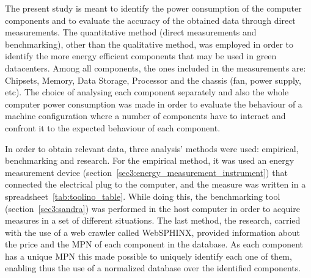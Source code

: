     The present study is meant to identify the power consumption of the computer components and to evaluate the accuracy of the obtained data through direct measurements. The quantitative method (direct measurements and benchmarking), other than the qualitative method, was employed in order to identify the more energy efficient components that may be used in green datacenters. Among all components, the ones included in the measurements are: Chipsets, Memory, Data Storage, Processor and the chassis (fan, power supply, etc).
    The choice of analysing each component separately and also the whole computer power consumption was made in order to evaluate the behaviour of a machine configuration where a number of components have to interact and confront it to the expected behaviour of each component.

    In order to obtain relevant data, three analysis' methods were used: empirical, benchmarking and research. For the empirical method, it was used an energy measurement device (section~\ref{sec3:energy_measurement_instrument}) that connected the electrical plug to the computer, and the measure was written in a spreadsheet~\ref{tab:toolino_table}. While doing this, the benchmarking tool (section~\ref{sec3:sandra}) was performed in the host computer in order to acquire measures in a set of different situations. The last method, the research, carried with the use of a web crawler called WebSPHINX, provided information about the price and the MPN of each component in the database. As each component has a unique MPN this made possible to uniquely identify each one of them, enabling thus the use of a normalized database over the identified components.


